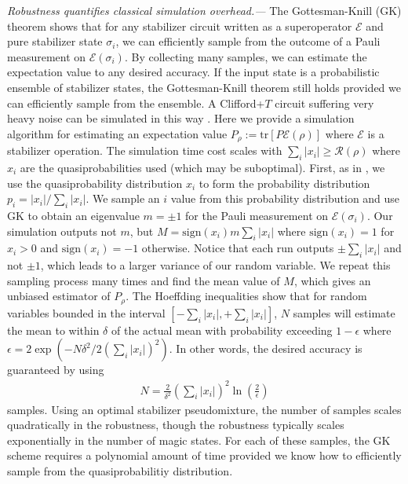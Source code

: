 \documentclass[aps,prl,twocolumn,showpacs,superscriptaddress,groupedaddress,amsmath,amssymb]{revtex4-1}  %
\begin{document}
\noindent\textit{Robustness quantifies classical simulation overhead.---}
The Gottesman-Knill (GK) theorem shows that for any stabilizer circuit written as a superoperator $\mathcal{E}$ and pure stabilizer state $\sigma_i$, we can efficiently sample from the outcome of a Pauli measurement on $\mathcal{E}(\sigma_i)$.  By collecting many samples, we can estimate the expectation value to any desired accuracy.  If the input state is a probabilistic ensemble of stabilizer states, the Gottesman-Knill theorem still holds provided we can efficiently sample from the ensemble. A Clifford+$T$ circuit suffering very heavy noise can be simulated in this way \cite{buhrman_new_2006,virmani_classical_2005,plenio_upper_2010}. Here we provide a simulation algorithm for estimating an expectation value  $P_{\rho}:=\mathrm{tr}[P\mathcal{E}(\rho)]$ where $\mathcal{E}$ is a stabilizer operation.  The simulation time cost scales with $\sum_i|x_i| \geq \mathcal{R}(\rho)$ where $x_i$ are the quasiprobabilities used (which may be suboptimal).  First, as in \cite{pashayan_estimating_2015}, we use the quasiprobability distribution $x_i$ to form the probability distribution $p_i=|x_i|/\sum_i|x_i|$.  We sample an $i$ value from this probability distribution and use GK to obtain an eigenvalue $m=\pm 1$ for the Pauli measurement on $\mathcal{E}(\sigma_i)$. Our simulation outputs not $m$, but $M=\mathrm{sign}(x_i)m  \sum_i|x_i|$ where $\mathrm{sign}(x_i)=1$ for $x_i>0$ and $\mathrm{sign}(x_i)=-1$ otherwise.  Notice that each run outputs $\pm \sum_i|x_i|$ and not $\pm 1$, which leads to a larger variance of our random variable.  We repeat this sampling process many times and find the mean value of $M$, which gives an unbiased estimator of $P_{\rho}$. 
The Hoeffding inequalities show that for random variables bounded in the interval $[-\sum_i|x_i|,+\sum_i|x_i|]$,  $N$ samples will estimate the mean to within $\delta$ of the actual mean with probability exceeding $1- \epsilon$ where $\epsilon=2 \exp( - N \delta^2 /2 (\sum_i|x_i|)^2)$.  In other words, the desired accuracy is guaranteed by using
\begin{align}
	N = \frac{2}{\delta^2}(\sum_i|x_i|)^2   \ln \left( \frac{2}{\epsilon} \right)\label{eqn:SampleN}	
\end{align}
samples. Using an optimal stabilizer pseudomixture, the number of samples scales quadratically in the robustness, though the robustness typically scales exponentially in the number of magic states.  For each of these samples, the GK scheme requires a polynomial amount of time provided we know how to efficiently sample from the quasiprobabilitiy distribution.  
\end{document}
